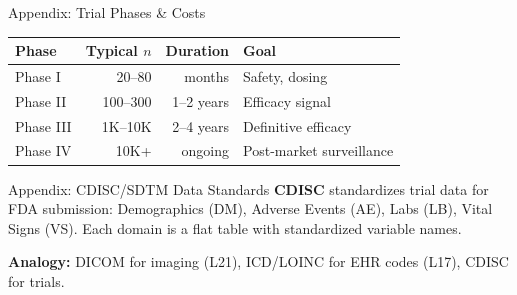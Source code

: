 \documentclass[aspectratio=169,10pt]{beamer}
\begin{document}
\begin{frame}{Appendix: Trial Phases \& Costs}
{\small
\begin{center}
\renewcommand{\arraystretch}{1.15}
\begin{tabular}{lrrp{4.5cm}}
\toprule
\textbf{Phase} & \textbf{Typical $n$} & \textbf{Duration} & \textbf{Goal} \\
\midrule
Phase I & 20--80 & months & Safety, dosing \\
Phase II & 100--300 & 1--2 years & Efficacy signal \\
Phase III & 1K--10K & 2--4 years & Definitive efficacy \\
Phase IV & 10K+ & ongoing & Post-market surveillance \\
\bottomrule
\end{tabular}
\end{center}
}
\end{frame}

\begin{frame}{Appendix: CDISC/SDTM Data Standards}
\textbf{CDISC} standardizes trial data for FDA submission: Demographics (DM), Adverse Events (AE), Labs (LB), Vital Signs (VS). Each domain is a flat table with standardized variable names.

\vspace{0.2em}
\textbf{Analogy:} DICOM for imaging (L21), ICD/LOINC for EHR codes (L17), CDISC for trials.
\end{frame}
\end{document}

